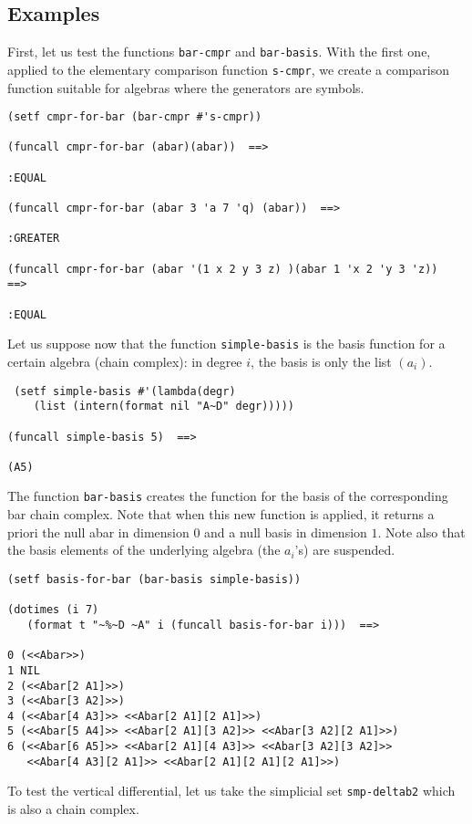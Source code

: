 \subsection* {Examples}

First, let us test the functions {\tt bar-cmpr} and {\tt bar-basis}. With the first one, applied
to the elementary comparison function {\tt s-cmpr}, we create a comparison function suitable
for algebras where the generators are symbols.

{\footnotesize\begin{verbatim}
(setf cmpr-for-bar (bar-cmpr #'s-cmpr))

(funcall cmpr-for-bar (abar)(abar))  ==>

:EQUAL

(funcall cmpr-for-bar (abar 3 'a 7 'q) (abar))  ==>

:GREATER

(funcall cmpr-for-bar (abar '(1 x 2 y 3 z) )(abar 1 'x 2 'y 3 'z))  ==>

:EQUAL
\end{verbatim}}
Let us suppose now that the function {\tt simple-basis} is the basis function for a certain
algebra (chain complex): in degree $i$, the basis is only the list $(a_i)$.
{\footnotesize\begin{verbatim}
 (setf simple-basis #'(lambda(degr)
    (list (intern(format nil "A~D" degr)))))

(funcall simple-basis 5)  ==>

(A5)
\end{verbatim}}
The function {\tt bar-basis} creates the function for the basis of the cor\-res\-pon\-ding bar chain complex. Note
that when this new  function is applied, it returns a priori the null abar in dimension $0$
and a null basis in dimension $1$. Note also that the basis elements
of the underlying algebra (the $a_i$'s) are suspended.
{\footnotesize\begin{verbatim}
(setf basis-for-bar (bar-basis simple-basis))

(dotimes (i 7)
   (format t "~%~D ~A" i (funcall basis-for-bar i)))  ==>

0 (<<Abar>>)
1 NIL
2 (<<Abar[2 A1]>>)
3 (<<Abar[3 A2]>>)
4 (<<Abar[4 A3]>> <<Abar[2 A1][2 A1]>>)
5 (<<Abar[5 A4]>> <<Abar[2 A1][3 A2]>> <<Abar[3 A2][2 A1]>>)
6 (<<Abar[6 A5]>> <<Abar[2 A1][4 A3]>> <<Abar[3 A2][3 A2]>>
   <<Abar[4 A3][2 A1]>> <<Abar[2 A1][2 A1][2 A1]>>)
\end{verbatim}}
To test the vertical differential, let us take the simplicial set  {\tt smp-deltab2} which is also a chain complex.
